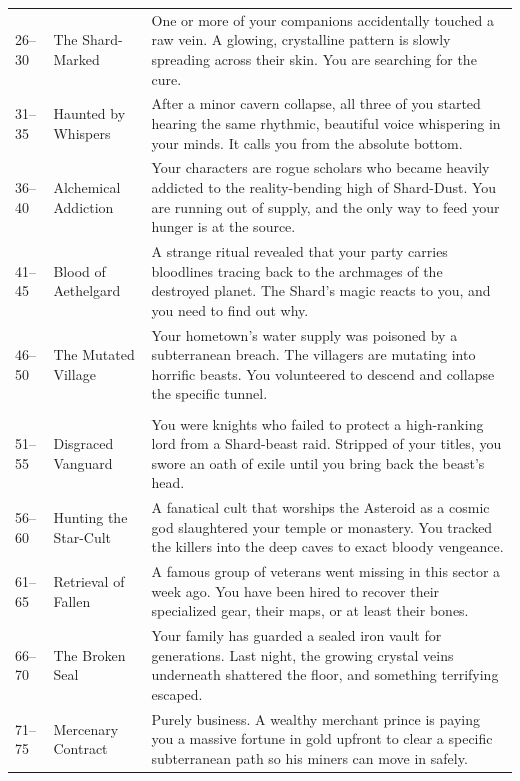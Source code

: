\begin{longtable}{lp{4cm}p{9.5cm}}
\midrule
\rowcolor{white}\multicolumn{3}{l}{\textbf{Category 2: The Creeping Corruption}} \\
\midrule
26–30 & The Shard-Marked & One or more of your companions accidentally touched a raw vein. A glowing, crystalline pattern is slowly spreading across their skin. You are searching for the cure. \\
31–35 & Haunted by Whispers & After a minor cavern collapse, all three of you started hearing the same rhythmic, beautiful voice whispering in your minds. It calls you from the absolute bottom. \\
36–40 & Alchemical Addiction & Your characters are rogue scholars who became heavily addicted to the reality-bending high of Shard-Dust. You are running out of supply, and the only way to feed your hunger is at the source. \\
41–45 & Blood of Aethelgard & A strange ritual revealed that your party carries bloodlines tracing back to the archmages of the destroyed planet. The Shard’s magic reacts to you, and you need to find out why. \\
46–50 & The Mutated Village & Your hometown’s water supply was poisoned by a subterranean breach. The villagers are mutating into horrific beasts. You volunteered to descend and collapse the specific tunnel. \\

\midrule
\rowcolor{white}\multicolumn{3}{l}{\textbf{Category 3: Vengeance, Duty \& Honor}} \\
\midrule
51–55 & Disgraced Vanguard & You were knights who failed to protect a high-ranking lord from a Shard-beast raid. Stripped of your titles, you swore an oath of exile until you bring back the beast's head. \\
56–60 & Hunting the Star-Cult & A fanatical cult that worships the Asteroid as a cosmic god slaughtered your temple or monastery. You tracked the killers into the deep caves to exact bloody vengeance. \\
61–65 & Retrieval of Fallen & A famous group of veterans went missing in this sector a week ago. You have been hired to recover their specialized gear, their maps, or at least their bones. \\
66–70 & The Broken Seal & Your family has guarded a sealed iron vault for generations. Last night, the growing crystal veins underneath shattered the floor, and something terrifying escaped. \\
71–75 & Mercenary Contract & Purely business.
 A wealthy merchant prince is paying you a massive 
fortune in gold upfront to clear a specific subterranean path so his miners can move in safely. \\


\end{longtable}
